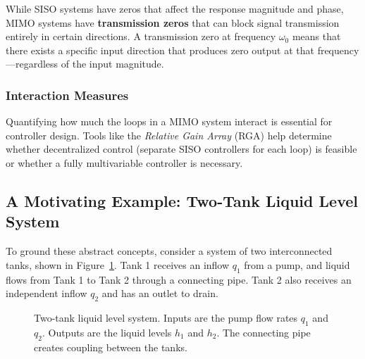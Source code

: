 While SISO systems have zeros that affect the response magnitude and phase, MIMO systems have \textbf{transmission zeros} that can block signal transmission entirely in certain directions. A transmission zero at frequency $\omega_0$ means that there exists a specific input direction that produces zero output at that frequency---regardless of the input magnitude.

\subsubsection{Interaction Measures}

Quantifying how much the loops in a MIMO system interact is essential for controller design. Tools like the \textit{Relative Gain Array} (RGA) help determine whether decentralized control (separate SISO controllers for each loop) is feasible or whether a fully multivariable controller is necessary.

\subsection{A Motivating Example: Two-Tank Liquid Level System}

To ground these abstract concepts, consider a system of two interconnected tanks, shown in Figure~\ref{fig:two_tank_system}. Tank 1 receives an inflow $q_1$ from a pump, and liquid flows from Tank 1 to Tank 2 through a connecting pipe. Tank 2 also receives an independent inflow $q_2$ and has an outlet to drain.

\begin{figure}[htbp]
\centering
{}
\caption{Two-tank liquid level system. Inputs are the pump flow rates $q_1$ and $q_2$. Outputs are the liquid levels $h_1$ and $h_2$. The connecting pipe creates coupling between the tanks.}
\label{fig:two_tank_system}
\end{figure}

